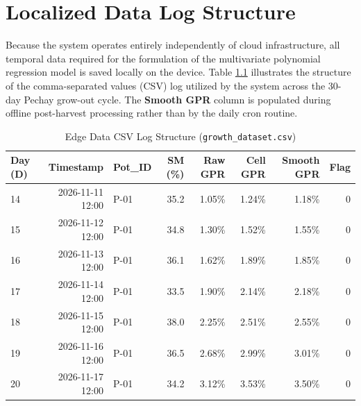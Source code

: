 
\chapter{Localized Data Log Structure}

\ifpdf
    \graphicspath{{Appendix8/Figs/Raster/}{Appendix8/Figs/PDF/}{Appendix8/Figs/}}
\else
    \graphicspath{{Appendix8/Figs/Vector/}{Appendix8/Figs/}}
\fi

Because the system operates entirely independently of cloud infrastructure, all temporal data required for the formulation of the multivariate polynomial regression model is saved locally on the device. Table \ref{tab:csv_structure} illustrates the structure of the comma-separated values (CSV) log utilized by the system across the 30-day Pechay grow-out cycle. The \textbf{Smooth GPR} column is populated during offline post-harvest processing rather than by the daily cron routine.

\begin{table}[htbp]
    \centering
    \caption{Edge Data CSV Log Structure (\texttt{growth\_dataset.csv})}
    \begin{tabular}{@{}lrlrrrrr@{}}
        \toprule
        \textbf{Day (D)} & \textbf{Timestamp} & \textbf{Pot\_ID} & \textbf{SM (\%)} & \textbf{Raw GPR} & \textbf{Cell GPR} & \textbf{Smooth GPR} & \textbf{Flag} \\
        \midrule
        14 & 2026-11-11 12:00 & P-01 & 35.2 & 1.05\% & 1.24\% & 1.18\% & 0 \\
        15 & 2026-11-12 12:00 & P-01 & 34.8 & 1.30\% & 1.52\% & 1.55\% & 0 \\
        16 & 2026-11-13 12:00 & P-01 & 36.1 & 1.62\% & 1.89\% & 1.85\% & 0 \\
        17 & 2026-11-14 12:00 & P-01 & 33.5 & 1.90\% & 2.14\% & 2.18\% & 0 \\
        18 & 2026-11-15 12:00 & P-01 & 38.0 & 2.25\% & 2.51\% & 2.55\% & 0 \\
        19 & 2026-11-16 12:00 & P-01 & 36.5 & 2.68\% & 2.99\% & 3.01\% & 0 \\
        20 & 2026-11-17 12:00 & P-01 & 34.2 & 3.12\% & 3.53\% & 3.50\% & 0 \\
        \bottomrule
    \end{tabular}
    \label{tab:csv_structure}
\end{table}


\clearpage
